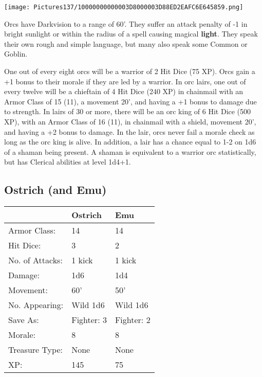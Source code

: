 \documentclass[a4paper,twoside,openany,10pt]{book}
\begin{document}
\begin{multicols}{2}
\begin{center} \texttt{[image: Pictures137/10000000000003D8000003D88ED2EAFC6E645859.png]} \end{center}


Orcs have Darkvision to a range of 60'. They suffer an attack penalty of -1 in bright sunlight or within the radius of a spell causing magical \textbf{light}. They speak their own rough and simple language, but many also speak some Common or Goblin.

One out of every eight orcs will be a warrior of 2 Hit Dice (75 XP). Orcs gain a +1 bonus to their morale if they are led by a warrior. In orc lairs, one out of every twelve will be a chieftain of 4 Hit Dice (240 XP) in chainmail with an Armor Class of 15 (11), a movement 20', and having a +1 bonus to damage due to strength. In lairs of 30 or more, there will be an orc king of 6 Hit Dice (500 XP), with an Armor Class of 16 (11), in chainmail with a shield, movement 20', and having a +2 bonus to damage. In the lair, orcs never fail a morale check as long as the orc king is alive. In addition, a lair has a chance equal to 1-2 on 1d6 of a shaman being present. A shaman is equivalent to a warrior orc statistically, but has Clerical abilities at level 1d4+1.


\subsection*{Ostrich (and Emu)}\label{ostrich-and-emu}

\begin{tabularx}{0.50\textwidth}{@{}llX@{}}
& Ostrich & Emu \\\hline
Armor Class: & 14 & 14 \\\hline
Hit Dice: & 3 & 2 \\\hline
No. of Attacks: & 1 kick & 1 kick \\\hline
Damage: & 1d6 & 1d4 \\\hline
Movement: & 60' & 50' \\\hline
No. Appearing: & Wild 1d6 & Wild 1d6 \\\hline
Save As: & Fighter: 3 & Fighter: 2 \\\hline
Morale: & 8 & 8 \\\hline
Treasure Type: & None & None \\\hline
XP: & 145 & 75 \\\hline
\end{tabularx}\medskip


\end{multicols}
\end{document}
